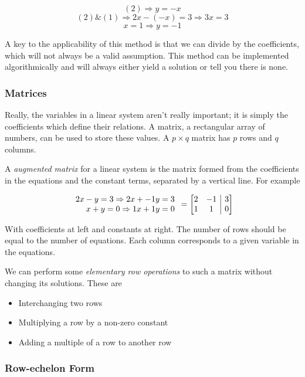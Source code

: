 \documentclass[12pt]{report}
\makeatletter
\newenvironment{amatrix}[1]{
    \left[\begin{array}{@{}*{#1}{c}|c@{}}
}{
    \end{array}\right]
}
\makeatother
\begin{document}
\begin{flushleft}
\[(2) \Rightarrow y = -x\]
\[(2) \& (1) \Rightarrow 2x - (-x) = 3 \Rightarrow 3x = 3\]
\[x = 1 \Rightarrow y = -1\]

A key to the applicability of this method is that we can divide by the
coefficients, which will not always be a valid assumption. This method can
be implemented algorithmically and will always either yield a solution or tell
you there is none.

\subsubsection*{Matrices}

Really, the variables in a linear system aren't really important; it is simply
the coefficients which define their relations. A matrix, a rectangular array of
numbers, can be used to store these values. A \(p \times q\) matrix has \(p\)
rows and \(q\) columns.

A \textit{augmented matrix} for a linear system is the matrix formed from the
coefficients in the equations and the constant terms, separated by a vertical
line. For example

\[
    \begin{array}{r}
        2x - y = 3 \Rightarrow 2x + -1y = 3 \\
        x + y = 0 \Rightarrow 1x + 1y = 0
    \end{array}
    =
    \begin{amatrix}{2}
        2 & -1 & 3 \\ 1 & 1 & 0
    \end{amatrix}
\]

With coefficients at left and constants at right. The number of rows should be
equal to the number of equations. Each column corresponds to a given variable
in the equations.

We can perform some \textit{elementary row operations} to such a matrix without
changing its solutions. These are
\begin{itemize}
    \item Interchanging two rows
    \item Multiplying a row by a non-zero constant
    \item Adding a multiple of a row to another row
\end{itemize}

\subsubsection*{Row-echelon Form}


\end{flushleft}
\end{document}
